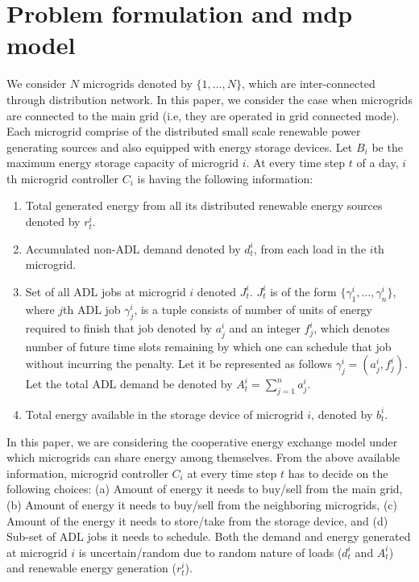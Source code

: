 \section{Problem formulation and mdp model}
We consider $N$ microgrids denoted by $\{1,\ldots,N\}$, which are inter-connected through distribution network. In this paper, we consider the case when microgrids are connected  to the main grid (i.e, they are operated in grid connected mode). Each microgrid comprise of the distributed small scale renewable power generating sources and also equipped with energy storage devices. Let $B_i$ be the maximum energy storage capacity of microgrid $i$. At every time step $t$ of a day, $i$th microgrid controller $C_i$ is having the following information:
\begin{enumerate}[label=(\alph*)]
\item Total generated energy from all its distributed renewable energy sources denoted by  $r_t^i$.
\item Accumulated non-ADL demand denoted by $d_t^i$, from each load in the $i$th microgrid. 
\item Set of all ADL jobs at microgrid $i$ denoted $J_{t}^{i}$.  $J_{t}^{i}$ is of the form $\{\gamma_{1}^{i},\ldots,\gamma_{n}^{i}\}$, where $j$th ADL job $\gamma_{j}^{i}$, is a tuple consists of  number of units of energy required to finish that job denoted by $a_{j}^{i}$ and an integer  $f_{j}^{i}$, which denotes number of future time slots remaining by which one can schedule that job without incurring the penalty. Let  it be represented as follows $\gamma_{j}^{i} = (a_{j}^{i}, f_{j}^{i})$. Let the total ADL demand be denoted by $A_t^i= \sum_{j=1}^{n} a_j^i$.
\item  Total energy available in the storage device of microgrid $i$, denoted by $b_{t}^{i}$.
\end{enumerate} 
In this paper, we are considering the cooperative energy exchange model under which microgrids can share energy among themselves. 
From the above available information, microgrid controller  $C_i$ at every time step $t$ has to decide on the following choices: (a)  Amount of energy it needs to buy/sell from the main grid, (b) Amount of energy it needs to buy/sell from the neighboring microgrids,
(c) Amount of the energy it needs to store/take from the storage device, and (d) Sub-set of ADL jobs it needs to schedule. Both the demand and energy generated at microgrid $i$ is uncertain/random due to  random nature of  loads ($d_t^i$ and $A_t^i$) and renewable energy generation ($r_t^i$). 

